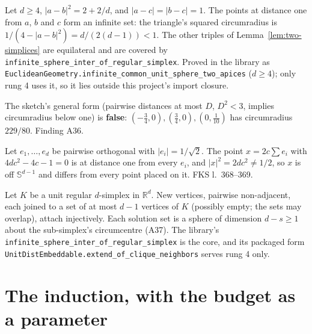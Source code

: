 \begin{lemma}
  \label{lem:circumradius}
  \leanok
  Let $d \ge 4$, $\lvert a - b\rvert^2 = 2 + 2/d$, and $\lvert a - c\rvert = \lvert b - c\rvert = 1$.
  The points at distance one from $a$, $b$ and $c$ form an infinite set: the triangle's
  squared circumradius is $1/(4 - \lvert a-b\rvert^2) = d/(2(d-1)) < 1$. The other triples of
  Lemma~\ref{lem:two-simplices} are equilateral and are covered by
  \texttt{infinite\_sphere\_inter\_of\_regular\_simplex}. Proved in the library as
  \texttt{EuclideanGeometry.infinite\_common\_unit\_sphere\_two\_apices} ($d \ge 4$); only
  rung 4 uses it, so it lies outside this project's import closure.

  The sketch's general form (pairwise distances at most $D$, $D^2 < 3$, implies circumradius
  below one) is \textbf{false}: $(-\tfrac34, 0), (\tfrac34, 0), (0, \tfrac1{10})$ has
  circumradius $229/80$. Finding A36.
\end{lemma}

\begin{lemma}
  \label{lem:basis-apex}
  \leanok
  Let $e_1, \dots, e_d$ be pairwise orthogonal with $\lvert e_i\rvert = 1/\sqrt 2$. The point
  $x = 2c \sum e_i$ with $4dc^2 - 4c - 1 = 0$ is at distance one from every $e_i$, and
  $\lvert x\rvert^2 = 2dc^2 \ne 1/2$, so $x$ is off $\mathbb{S}^{d-1}$ and differs from every
  point placed on it. FKS l.~368--369.
\end{lemma}

\begin{lemma}
  \label{lem:simplex-attach}
  \leanok
  Let $K$ be a unit regular $d$-simplex in $\mathbb{R}^d$. New vertices, pairwise
  non-adjacent, each joined to a set of at most $d - 1$ vertices of $K$ (possibly empty; the
  sets may overlap), attach injectively. Each solution set is a sphere of dimension
  $d - s \ge 1$ about the sub-simplex's circumcentre (A37). The library's
  \texttt{infinite\_sphere\_inter\_of\_regular\_simplex} is the core, and its packaged form
  \texttt{UnitDistEmbeddable.extend\_of\_clique\_neighbors} serves rung 4 only.
\end{lemma}

\section{The induction, with the budget as a parameter}

